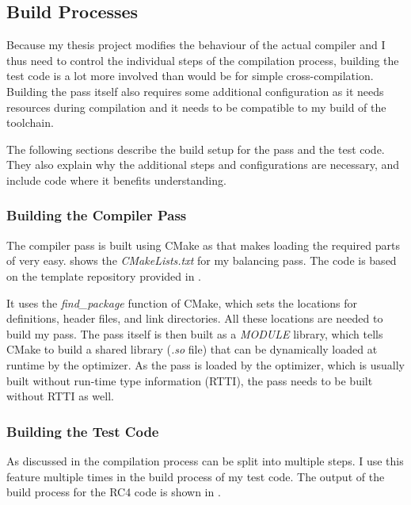
\subsection{Build Processes}
Because my thesis project modifies the behaviour of the actual compiler and I thus need to control the individual steps of the compilation process, building the test code is a lot more involved than would be for simple cross-compilation.
Building the pass itself also requires some additional configuration as it needs \llvm{} resources during compilation and it needs to be compatible to my build of the \llvm{} toolchain.

The following sections describe the build setup for the pass and the test code.
They also explain why the additional steps and configurations are necessary, and include code where it benefits understanding.

\subsubsection{Building the Compiler Pass}
The compiler pass is built using CMake as that makes loading the required parts of \llvm{} very easy.
 shows the \emph{CMakeLists.txt} for my balancing pass.
The code is based on the template repository provided in \cite{sampson2015llvm}.



It uses the \emph{find\_package} function of CMake, which sets the locations for definitions, header files, and link directories.
All these locations are needed to build my pass.
The pass itself is then built as a \emph{MODULE} library, which tells CMake to build a shared library (\emph{.so} file) that can be dynamically loaded at runtime by the optimizer.
As the pass is loaded by the optimizer, which is usually built without run-time type information (RTTI), the pass needs to be built without RTTI as well.

\subsubsection{Building the Test Code}
As discussed in  the \llvm{} compilation process can be split into multiple steps.
I use this feature multiple times in the build process of my test code.
The output of the build process for the RC4 code is shown in .

